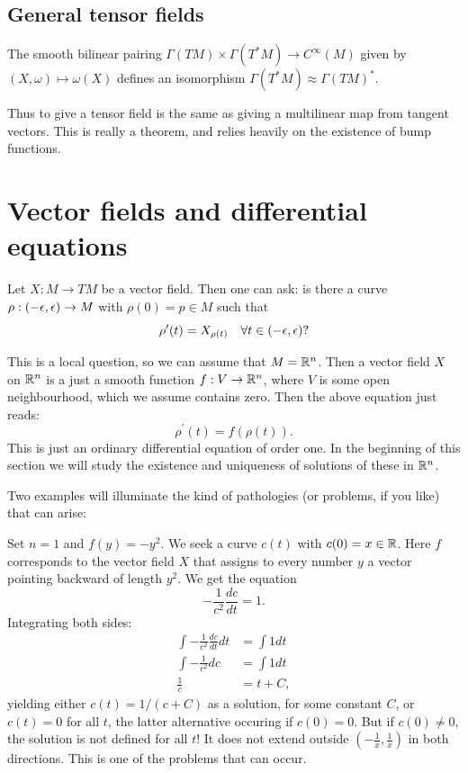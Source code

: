 \documentclass[11pt, english]{article}
\begin{document}
\subsection{General tensor fields}

\begin{prop}
The smooth bilinear pairing $\Gamma(TM) \times \Gamma(T^\ast M) \to C^\infty (M)$ given by $(X,\omega) \mapsto \omega(X)$ defines an isomorphism $\Gamma(T^\ast M) \approx \Gamma(TM)^\ast$. 
\end{prop}
Thus to give a tensor field is the same as giving a multilinear map from tangent vectors. This is really a theorem, and relies heavily on the existence of bump functions.
 

\newpage
\section{Vector fields and differential equations}
Let $X: M \to TM$ be a vector field. Then one can ask: is there a curve $\rho:(-\epsilon,\epsilon) \to M$ with $\rho(0)=p \in M$ such that
\[
\rho^\prime(t) = X_{\rho(t)} \quad \forall t \in (-\epsilon,\epsilon) ?
\]

This is a local question, so we can assume that $M=\mathbb{R}^n$. Then a vector field $X$ on $\mathbb{R}^n$ is a just a smooth function $f:V\to \mathbb{R}^n$, where $V$ is some open neighbourhood, which we assume contains zero. Then the above equation just reads:
\[
\rho^\prime(t) = f(\rho(t)).
\]
This is just an ordinary differential equation of order one. In the beginning of this section we will study the existence and uniqueness of solutions of these in $\mathbb{R}^n$.

Two examples will illuminate the kind of pathologies (or problems, if you like) that can arise:

\begin{example}
Set $n=1$ and $f(y)=-y^2$. We seek a curve $c(t)$ with $c(0)=x \in \mathbb{R}$. Here $f$ corresponds to the vector field $X$ that assigns to every number $y$ a vector pointing backward of length $y^2$. We get the equation
\[
-\frac{1}{c^2} \frac{d c}{d t}= 1.
\]
Integrating both sides:
\begin{align*}
\int -\frac{1}{c^2} \frac{dc}{dt} dt &= \int 1 dt \\
\int -\frac{1}{c^2} dc &= \int 1 dt \\
\frac{1}{c} &=t + C,
\end{align*}
yielding either $c(t)=1/(c+C)$ as a solution, for some constant $C$, or $c(t)=0$ for all $t$, the latter alternative occuring if $c(0)=0$. But if $c(0) \neq 0$, the solution is not defined for all $t$! It does not extend outside $(-\frac{1}{x},\frac{1}{x})$ in both directions. This is one of the problems that can occur.
\end{example}
\end{document}

